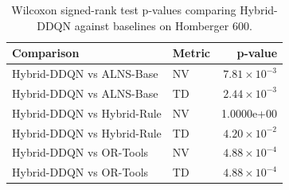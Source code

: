 \begin{table}[htbp]
\centering
\caption{Wilcoxon signed-rank test p-values comparing Hybrid-DDQN against baselines on Homberger 600.}
\label{tab:wilcoxon_homberger_600}
\begin{tabular}{llr}
\hline
\textbf{Comparison} & \textbf{Metric} & \textbf{p-value} \\ \hline
Hybrid-DDQN vs ALNS-Base & NV & $7.81 \times 10^{-3}$ \\
Hybrid-DDQN vs ALNS-Base & TD & $2.44 \times 10^{-3}$ \\
Hybrid-DDQN vs Hybrid-Rule & NV & 1.0000e+00 \\
Hybrid-DDQN vs Hybrid-Rule & TD & $4.20 \times 10^{-2}$ \\
Hybrid-DDQN vs OR-Tools & NV & $4.88 \times 10^{-4}$ \\
Hybrid-DDQN vs OR-Tools & TD & $4.88 \times 10^{-4}$ \\
\hline
\end{tabular}
\end{table}

